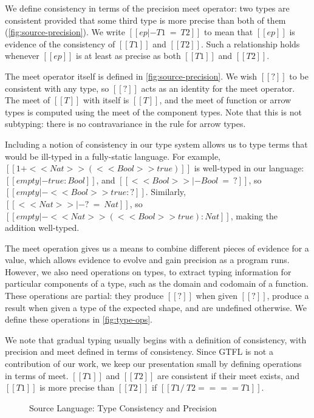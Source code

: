 \documentclass[11pt]{article}
\begin{document}
We define consistency in terms of the precision meet operator: two types
are consistent provided that some third type is more precise than both of them (\autoref{fig:source-precision}).
We write $[[ep |- T1 ~=~ T2]]$ to mean that $[[ep]]$ is evidence of the consistency of $[[T1]]$ and $[[T2]]$.
Such a relationship holds whenever $[[ep]]$ is at least as precise as both $[[T1]]$ and $[[T2]]$.

The meet operator itself is defined in \autoref{fig:source-precision}. We wish $[[?]]$ to be consistent with any type,
so $[[?]]$ acts as an identity for the meet operator. The meet of $[[T]]$ with itself is $[[T]]$, and
the meet of function or arrow types is computed using the meet of the component types.
Note that this is not subtyping: there is no contravariance in the rule for arrow types.

Including a notion of consistency in our type system allows us to type terms that would be ill-typed
in a fully-static language.
For example, $[[1 + <<Nat>>(<<Bool>> true)]]$ is well-typed in our language: $[[empty |- true : Bool ]]$,
and $[[<<Bool>> |- Bool ~=~ ?]]$, so $[[empty |- <<Bool>>true : ? ]]$. Similarly, $[[<<Nat>> |- ? ~=~ Nat]]$,
so $[[empty |- <<Nat>>(<<Bool>>true) : Nat]]$, making the addition well-typed.

The meet operation gives us a means to combine different pieces of evidence for a value,
which allows evidence to evolve and gain precision as a program runs.
However, we also need operations on types, to extract typing information for particular
components of a type, such as the domain and codomain of a function. These operations are partial: they produce $[[?]]$ 
when given $[[?]]$, produce a result when given a type of the expected shape, and are undefined otherwise.
We define these operations in \autoref{fig:type-ops}.

We note that gradual typing usually begins with a definition of consistency, with precision and meet defined
in terms of consistency. Since GTFL is not a contribution of our work, we keep our presentation small
by defining operations in terms of meet. $[[T1]]$ and $[[T2]]$ are consistent if their meet exists,
and $[[T1]]$ is more precise than $[[T2]]$ if $[[T1 /\ T2 ==== T1]]$.


\begin{figure}[H]
	\ottdefnConsistent{}
	\ottdefnMeet{}
	\caption{Source Language: Type Consistency and Precision}
	\label{fig:source-precision}
\end{figure}
\end{document}
